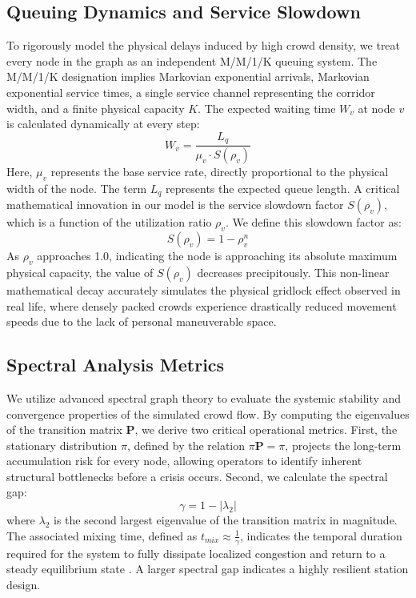 \documentclass[conference]{IEEEtran}
\begin{document}
\subsection{Queuing Dynamics and Service Slowdown}
To rigorously model the physical delays induced by high crowd density, we treat every node in the graph as an independent M/M/1/K queuing system. The M/M/1/K designation implies Markovian exponential arrivals, Markovian exponential service times, a single service channel representing the corridor width, and a finite physical capacity $K$. The expected waiting time $W_v$ at node $v$ is calculated dynamically at every step:
\begin{equation}
W_v = \frac{L_q}{\mu_v \cdot S(\rho_v)}
\end{equation}
Here, $\mu_v$ represents the base service rate, directly proportional to the physical width of the node. The term $L_q$ represents the expected queue length. A critical mathematical innovation in our model is the service slowdown factor $S(\rho_v)$, which is a function of the utilization ratio $\rho_v$. We define this slowdown factor as:
\begin{equation}
S(\rho_v) = 1 - \rho_v^n
\end{equation}
As $\rho_v$ approaches 1.0, indicating the node is approaching its absolute maximum physical capacity, the value of $S(\rho_v)$ decreases precipitously. This non-linear mathematical decay accurately simulates the physical gridlock effect observed in real life, where densely packed crowds experience drastically reduced movement speeds due to the lack of personal maneuverable space.

\subsection{Spectral Analysis Metrics}
We utilize advanced spectral graph theory to evaluate the systemic stability and convergence properties of the simulated crowd flow. By computing the eigenvalues of the transition matrix $\mathbf{P}$, we derive two critical operational metrics. First, the stationary distribution $\pi$, defined by the relation $\pi \mathbf{P} = \pi$, projects the long-term accumulation risk for every node, allowing operators to identify inherent structural bottlenecks before a crisis occurs. Second, we calculate the spectral gap:
\begin{equation}
\gamma = 1 - |\lambda_2|
\end{equation}
where $\lambda_2$ is the second largest eigenvalue of the transition matrix in magnitude. The associated mixing time, defined as $t_{mix} \approx \frac{1}{\gamma}$, indicates the temporal duration required for the system to fully dissipate localized congestion and return to a steady equilibrium state \cite{b5}. A larger spectral gap indicates a highly resilient station design.
\end{document}
